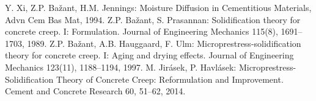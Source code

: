 \documentclass[a4paper]{article}
\begin{document}
\begin{thebibliography}{99}
 Y. Xi, Z.P. Ba\v{z}ant, H.M. Jennings: Moisture Diffusion
  in Cementitious Materials, Advn Cem Bas Mat, 1994.
 Z.P. Ba\v{z}ant, S. Prasannan: Solidification theory for concrete creep. {I}: Formulation. Journal of Engineering Mechanics 115(8), 1691–1703, 1989.
 Z.P. Ba\v{z}ant, A.B. Hauggaard, F. Ulm: Microprestress-solidification theory for concrete creep. {I}: Aging and drying effects. Journal of Engineering Mechanics 123(11), 1188–1194, 1997.
 M. Jir\'{a}sek, P. Havl\'{a}sek: Microprestress-Solidification Theory of Concrete Creep: Reformulation and Improvement. Cement and Concrete Research 60, 51–62, 2014.


\end{thebibliography}
\end{document}
